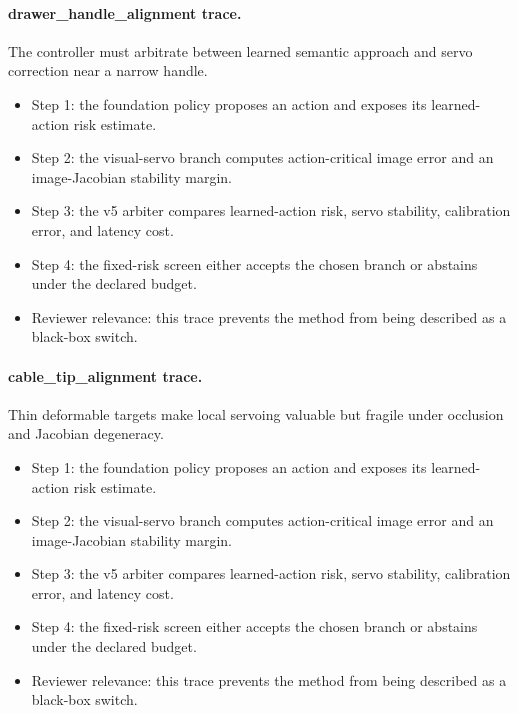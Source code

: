 \documentclass{article}
\begin{document}
\paragraph{drawer\_handle\_alignment trace.} The controller must arbitrate between learned semantic approach and servo correction near a narrow handle.
\begin{itemize}
\item Step 1: the foundation policy proposes an action and exposes its learned-action risk estimate.
\item Step 2: the visual-servo branch computes action-critical image error and an image-Jacobian stability margin.
\item Step 3: the v5 arbiter compares learned-action risk, servo stability, calibration error, and latency cost.
\item Step 4: the fixed-risk screen either accepts the chosen branch or abstains under the declared budget.
\item Reviewer relevance: this trace prevents the method from being described as a black-box switch.
\end{itemize}
\paragraph{cable\_tip\_alignment trace.} Thin deformable targets make local servoing valuable but fragile under occlusion and Jacobian degeneracy.
\begin{itemize}
\item Step 1: the foundation policy proposes an action and exposes its learned-action risk estimate.
\item Step 2: the visual-servo branch computes action-critical image error and an image-Jacobian stability margin.
\item Step 3: the v5 arbiter compares learned-action risk, servo stability, calibration error, and latency cost.
\item Step 4: the fixed-risk screen either accepts the chosen branch or abstains under the declared budget.
\item Reviewer relevance: this trace prevents the method from being described as a black-box switch.
\end{itemize}
\end{document}
